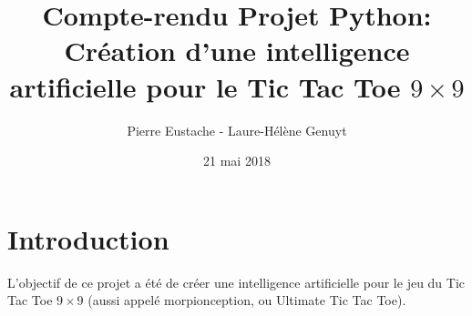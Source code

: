 \documentclass[10pt]{article}
\title{Compte-rendu Projet Python: \\ Création d'une intelligence artificielle pour le Tic Tac Toe $9\times9$ }
\author{Pierre Eustache - Laure-Hélène Genuyt }
\date{21 mai 2018}
\begin{document}
\maketitle



\section{Introduction}
L'objectif de ce projet a été de créer une intelligence artificielle pour le jeu du Tic Tac Toe $9\times9$ (aussi appelé morpionception, ou Ultimate Tic Tac Toe). 
\paragraph{}
\end{document}
